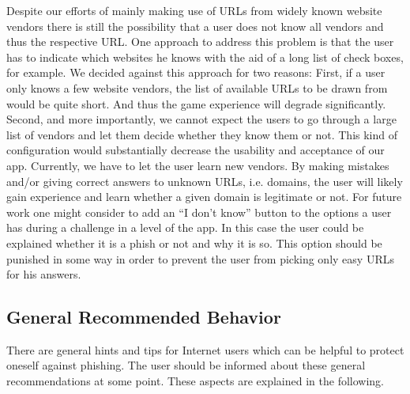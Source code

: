 \begin{description}[leftmargin=0cm]
\item[Unknown Website Vendors:] Despite our efforts of mainly making use of URLs from widely known website vendors there is still the possibility that a user does not know all vendors and thus the respective URL. 
One approach to address this problem is that the user has to indicate which websites he knows with the aid of a long list of check boxes, for example. 
We decided against this approach for two reasons: 
First, if a user only knows a few website vendors, the list of available URLs to be drawn from would be quite short. 
And thus the game experience will degrade significantly. 
Second, and more importantly, we cannot expect the users to go through a large list of vendors and let them decide whether they know them or not. 
This kind of configuration would substantially decrease the usability and acceptance of our app. 
Currently, we have to let the user learn new vendors. 
By making mistakes and/or giving correct answers to unknown URLs, i.e. domains, the user will likely gain experience and learn whether a given domain is legitimate or not. 
For future work one might consider to add an ``I don't know'' button to the options a user has during a challenge in a level of the app.
In this case the user could be explained whether it is a phish or not and why it is so.
This option should be punished in some way in order to prevent the user from picking only easy URLs for his answers.
\end{description}


\subsection{General Recommended Behavior}
There are general hints and tips for Internet users which can be helpful to protect oneself against phishing.
The user should be informed about these general recommendations at some point.
These aspects are explained in the following.

